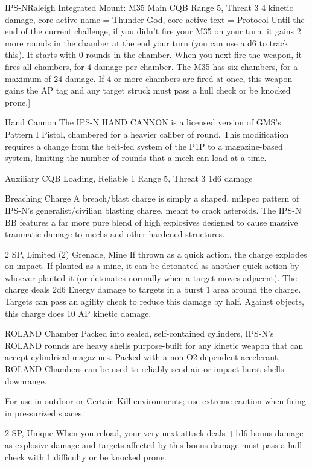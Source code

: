\begin{mech}{IPS-N}{Raleigh}
{Integrated Mount:
M35
Main CQB
Range 5, Threat 3
4 kinetic damage},
core active name = Thunder God,
core active text = {Protocol
Until the end of the current challenge, if you didn’t fire your M35 on your turn, it gains 2 more rounds in the chamber at the end your turn (you can use a d6 to track this). It starts with 0 rounds in the chamber. When you next fire the weapon, it fires all chambers, for 4 damage per chamber. The M35 has six chambers, for a maximum of 24 damage. If 4 or more chambers are fired at once, this weapon gains the AP tag and any target struck must pass a hull check or be knocked prone.}]


Hand Cannon
The IPS-N HAND CANNON is a licensed version of GMS’s Pattern I Pistol, chambered for a heavier caliber of round. This modification requires a change from the belt-fed system of the P1P to a magazine-based system, limiting the number of rounds that a mech can load at a time. 

Auxiliary CQB
Loading, Reliable 1
Range 5, Threat 3
1d6 damage

Breaching Charge
A breach/blast charge is simply a shaped, milspec pattern of IPS-N’s generalist/civilian blasting charge, meant to crack asteroids. The IPS-N BB features a far more pure blend of high explosives designed to cause massive traumatic damage to mechs and other hardened structures. 

2 SP, Limited (2)
Grenade, Mine
If thrown as a quick action, the charge explodes on impact. If planted as a mine, it can be detonated as another quick action by whoever planted it (or detonates normally when a target moves adjacent). The charge deals 2d6 Energy damage to targets in a burst 1 area around the charge. Targets can pass an agility check to reduce this damage by half. Against objects, this charge does 10 AP kinetic damage.

ROLAND Chamber
Packed into sealed, self-contained cylinders, IPS-N’s ROLAND rounds are heavy shells purpose-built for any kinetic weapon that can accept cylindrical magazines. Packed with a non-O2 dependent accelerant, ROLAND Chambers can be used to reliably send air-or-impact burst shells downrange. 

For use in outdoor or Certain-Kill environments; use extreme caution when firing in pressurized spaces.

2 SP, Unique
When you reload, your very next attack deals +1d6 bonus damage as explosive damage and targets affected by this bonus damage must pass a hull check with 1 difficulty or be knocked prone.


\end{mech}
